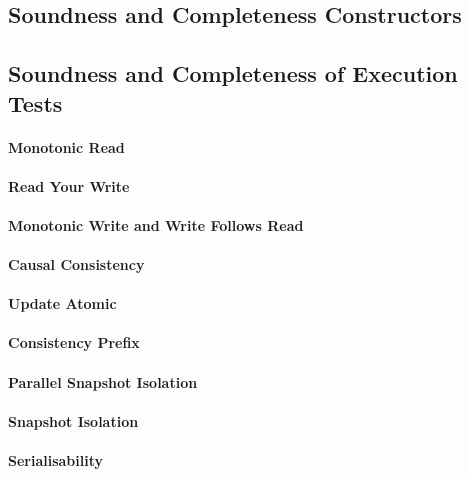 \subsection{Soundness and Completeness Constructors}
            \label{sec:sound-complete-constructor} 
            \label{sec:sound-constructor} 
            \label{sec:complete-constructor} 

\subsection{Soundness and Completeness of Execution Tests} 
            \label{sec:sound-complete-et}  
    \paragraph{Monotonic Read} \label{sec:sound-complete-mr} 
    \paragraph{Read Your Write} \label{sec:sound-complete-ryw} 
    \paragraph{Monotonic Write and Write Follows Read} 
            \label{sec:sound-complete-mw} \label{sec:sound-complete-wfr}  
    \paragraph{Causal Consistency} \label{sec:sound-complete-cc}  
    \paragraph{Update Atomic} \label{sec:sound-complete-ua} 
    \paragraph{Consistency Prefix} \label{sec:sound-complete-cp} 
    \paragraph{Parallel Snapshot Isolation} \label{sec:sound-complete-psi} 
    \paragraph{Snapshot Isolation} \label{sec:sound-complete-si} 
    \paragraph{Serialisability} \label{sec:sound-complete-ser} 
